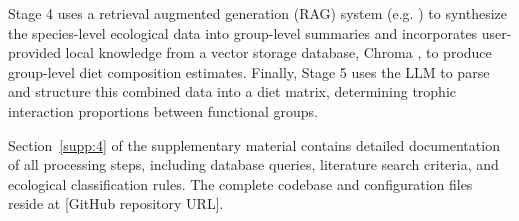 Stage 4 uses a retrieval augmented generation (RAG) system (e.g. \citep{keck2025extracting}) to synthesize the species-level ecological data into group-level summaries and incorporates user-provided local knowledge from a vector storage database, Chroma \citep{Chroma2024}, to produce group-level diet composition estimates. Finally, Stage 5 uses the LLM to parse and structure this combined data into a diet matrix, determining trophic interaction proportions between functional groups.

Section~\ref{supp:4} of the supplementary material contains detailed documentation of all processing steps, including database queries, literature search criteria, and ecological classification rules. The complete codebase and configuration files reside at [GitHub repository URL].
